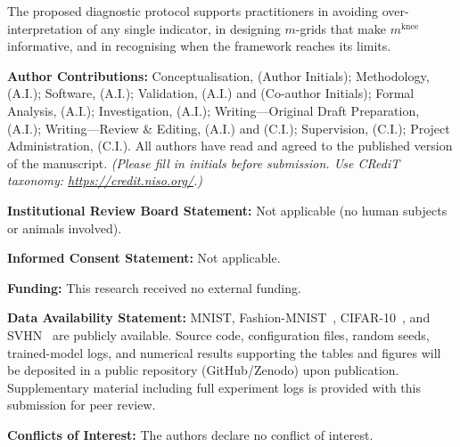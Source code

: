 \documentclass[11pt,a4paper]{article}
\newcommand{\mknee}{m^{\mathrm{knee}}}
\begin{document}
The proposed diagnostic protocol supports practitioners in avoiding
over-interpretation of any single indicator, in designing $m$-grids that make
$\mknee$ informative, and in recognising when the framework reaches its limits.

\vspace{1ex}
\noindent\textbf{Author Contributions:}
Conceptualisation, (Author Initials); Methodology, (A.I.);
Software, (A.I.); Validation, (A.I.) and (Co-author Initials);
Formal Analysis, (A.I.); Investigation, (A.I.);
Writing---Original Draft Preparation, (A.I.);
Writing---Review \& Editing, (A.I.) and (C.I.);
Supervision, (C.I.); Project Administration, (C.I.).
All authors have read and agreed to the published version of the manuscript.
\emph{(Please fill in initials before submission.  Use CRediT taxonomy:
\url{https://credit.niso.org/}.)}

\noindent\textbf{Institutional Review Board Statement:} Not applicable
(no human subjects or animals involved).

\noindent\textbf{Informed Consent Statement:} Not applicable.

\noindent\textbf{Funding:} This research received no external funding.

\noindent\textbf{Data Availability Statement:}
MNIST, Fashion-MNIST~\cite{lecun1998}, CIFAR-10~\cite{krizhevsky2009learning},
and SVHN~\cite{netzer2011reading} are publicly available.
Source code, configuration files, random seeds, trained-model logs, and
numerical results supporting the tables and figures will be deposited in a
public repository (GitHub/Zenodo) upon publication.
Supplementary material including full experiment logs is provided with this
submission for peer review.

\noindent\textbf{Conflicts of Interest:} The authors declare no conflict of interest.
\end{document}
